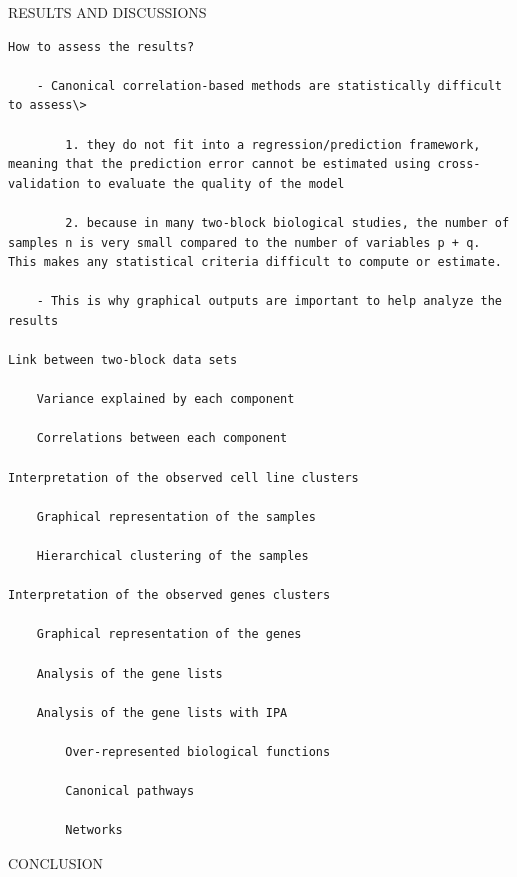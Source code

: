 \documentclass[
]{book}
\begin{document}
RESULTS AND DISCUSSIONS

\begin{verbatim}
How to assess the results?

    - Canonical correlation-based methods are statistically difficult to assess\>

        1. they do not fit into a regression/prediction framework, meaning that the prediction error cannot be estimated using cross-validation to evaluate the quality of the model

        2. because in many two-block biological studies, the number of samples n is very small compared to the number of variables p + q. This makes any statistical criteria difficult to compute or estimate.

    - This is why graphical outputs are important to help analyze the results

Link between two-block data sets

    Variance explained by each component

    Correlations between each component

Interpretation of the observed cell line clusters

    Graphical representation of the samples

    Hierarchical clustering of the samples

Interpretation of the observed genes clusters

    Graphical representation of the genes

    Analysis of the gene lists

    Analysis of the gene lists with IPA

        Over-represented biological functions

        Canonical pathways

        Networks
\end{verbatim}

CONCLUSION
\end{document}
